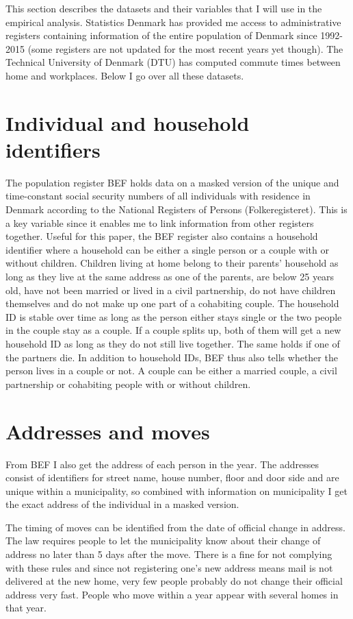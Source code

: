 This section describes the datasets and their variables that I will use in the empirical analysis. Statistics Denmark has provided me access to administrative registers containing information of the entire population of Denmark since 1992-2015 (some registers are not updated for the most recent years yet though). The Technical University of Denmark (DTU) has computed commute times between home and workplaces. Below I go over all these datasets.

\section{Individual and household identifiers}
 The population register BEF holds data on a masked version of the unique and time-constant social security numbers of all individuals with residence in Denmark according to the National Registers of Persons (Folkeregisteret). This is a key variable since it enables me to link information from other registers together. Useful for this paper, the BEF register also contains a household identifier where a household can be either a single person or a couple with or without children. Children living at home belong to their parents' household as long as they live at the same address as one of the parents, are below 25 years old, have not been married or lived in a civil partnership, do not have children themselves and do not make up one part of a cohabiting couple. The household ID is stable over time as long as the person either stays single or the two people in the couple stay as a couple. If a couple splits up, both of them will get a new household ID as long as they do not still live together. The same holds if one of the partners die. In addition to household IDs, BEF thus also tells whether the person lives in a couple or not. A couple can be either a married couple, a civil partnership or cohabiting people with or without children.

\section{Addresses and moves}
From BEF I also get the address of each person in the year. The addresses consist of identifiers for street name, house number, floor and door side and are unique within a municipality, so combined with information on municipality I get the exact address of the individual in a masked version.

The timing of moves can be identified from the date of official change in address. The law requires people to let the municipality know about their change of address no later than 5 days after the move. There is a fine for not complying with these rules and since not registering one's new address means mail is not delivered at the new home, very few people probably do not change their official address very fast. People who move within a year appear with several homes in that year. 

